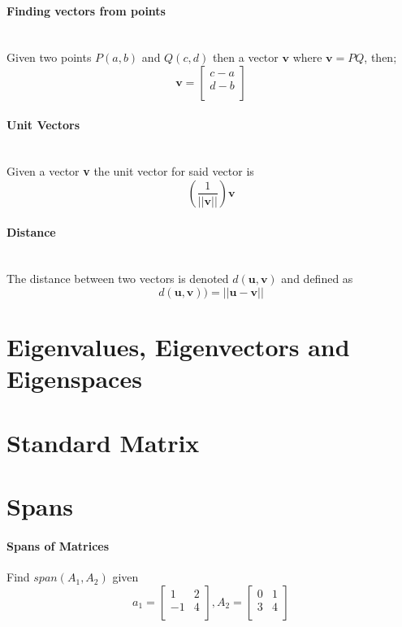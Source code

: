 \documentclass[12pt]{article}
\begin{document}
\paragraph{Finding vectors from points}
\hfill
\\
\indent Given two points $P(a, b)$ and $Q(c, d)$ then a vector $\textbf{v}$ where $\textbf{v} = PQ$, then; 
\[
\textbf{v} = 
\begin{bmatrix}
	c - a \\
	d - b \\
\end{bmatrix}
\]

\paragraph{Unit Vectors}
\hfill
\\
\indent Given a vector \textbf{v} the unit vector for said vector is
\[
	\left( \frac{1}{||\textbf{v}||} \right)  \textbf{v}
\]

\paragraph{Distance}
\hfill
\\
\indent The distance between two vectors is denoted $d(\textbf{u}, \textbf{v})$ and defined as
\[
	d(\textbf{u}, \textbf{v})) = || \textbf{u} - \textbf{v} ||
\]



\section{Eigenvalues, Eigenvectors and Eigenspaces}

\section{Standard Matrix}

\newpage

\section{Spans}

\paragraph{Spans of Matrices}
Find $span(A_1, A_2)$ given 
\[
a_1 = 
\begin{bmatrix}
1 & 2 \\
-1 & 4 \\
\end{bmatrix}
,
A_2 = 
\begin{bmatrix}
0 & 1 \\
3 & 4 \\
\end{bmatrix}
\]
\end{document}
